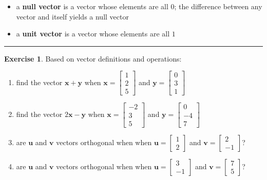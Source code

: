 \documentclass[
]{book}
\providecommand{\tightlist}{%
  \setlength{\itemsep}{0pt}\setlength{\parskip}{0pt}}
\theoremstyle{definition}
\theoremstyle{definition}
\theoremstyle{definition}
\newtheorem{exercise}{Exercise}[chapter]
\theoremstyle{remark}
\begin{document}
\begin{itemize}
\tightlist
\item
  a \textbf{null vector} is a vector whose elements are all \(0\); the difference between any vector and itself yields a null vector
\item
  a \textbf{unit vector} is a vector whose elements are all \(1\)
\end{itemize}

\begin{center}\rule{0.5\linewidth}{0.5pt}\end{center}

\begin{exercise}
\protect\hypertarget{exr:m-vectors}{}{\label{exr:m-vectors} }Based on vector definitions and operations:

\begin{enumerate}
\def\labelenumi{\alph{enumi})}
\item
  find the vector \(\mathbf{x} + \mathbf{y}\) when \(\mathbf{x} =\begin{bmatrix}  1 \\  2 \\  5 \end{bmatrix}\) and \(\mathbf{y} =\begin{bmatrix}  0\\  3 \\  1  \end{bmatrix}\)
\item
  find the vector \(2\mathbf{x} - \mathbf{y}\) when \(\mathbf{x} =\begin{bmatrix}  -2 \\  3 \\  5 \end{bmatrix}\) and \(\mathbf{y} =\begin{bmatrix}  0\\  -4 \\  7  \end{bmatrix}\)
\item
  are \(\mathbf{u}\) and \(\mathbf{v}\) vectors orthogonal when when \(\mathbf{u} =\begin{bmatrix}  1 \\  2 \end{bmatrix}\) and \(\mathbf{v} =\begin{bmatrix}  2\\  -1  \end{bmatrix}\)?
\item
  are \(\mathbf{u}\) and \(\mathbf{v}\) vectors orthogonal when when \(\mathbf{u} =\begin{bmatrix}  3 \\  -1 \end{bmatrix}\) and \(\mathbf{v} =\begin{bmatrix}  7\\  5  \end{bmatrix}\)?

\end{enumerate}
\end{exercise}
\end{document}
